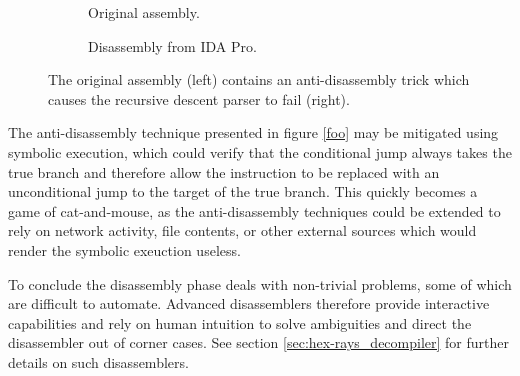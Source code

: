 \begin{figure}[htbp]
	\centering
	\begin{subfigure}[t]{0.59\textwidth}
		
		\caption{Original assembly.}
	\end{subfigure}
	\qquad
	\begin{subfigure}[t]{0.34\textwidth}
		
		\caption{Disassembly from IDA Pro.}
	\end{subfigure}
	\caption{The original assembly (left) contains an anti-disassembly trick which causes the recursive descent parser to fail (right).\label{fig:anti-disassembly}}
\end{figure}

The anti-disassembly technique presented in figure \ref{foo} may be mitigated using symbolic execution, which could verify that the conditional jump always takes the true branch and therefore allow the instruction to be replaced with an unconditional jump to the target of the true branch. This quickly becomes a game of cat-and-mouse, as the anti-disassembly techniques could be extended to rely on network activity, file contents, or other external sources which would render the symbolic exeuction useless.

To conclude the disassembly phase deals with non-trivial problems, some of which are difficult to automate. Advanced disassemblers therefore provide interactive capabilities and rely on human intuition to solve ambiguities and direct the disassembler out of corner cases. See section \ref{sec:hex-rays_decompiler} for further details on such disassemblers.

%
%
%
